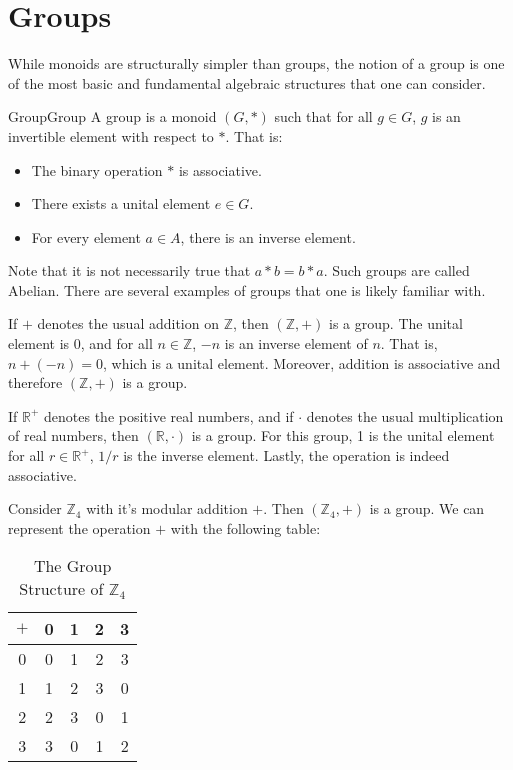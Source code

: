 \section{Groups}
    While monoids are structurally simpler than groups, the notion of a group
    is one of the most basic and fundamental algebraic structures that one can
    consider.
    \begin{fdefinition}{Group}{Group}
        A group is a \gls{monoid} $(G,*)$ such that for all $g\in{G}$, $g$ is
        an \gls{invertible element} with respect to $*$. That is:
        \begin{itemize}
            \setlength\itemsep{0em}
            \item The binary operation $*$ is associative.
            \item There exists a unital element $e\in{G}$.
            \item For every element $a\in{A}$, there is an inverse element.
        \end{itemize}
    \end{fdefinition}
    Note that it is not necessarily true that $a*b=b*a$. Such groups are called
    Abelian. There are several examples of groups that one is likely familiar
    with.
    \begin{example}
        If $+$ denotes the usual addition on $\mathbb{Z}$, then
        $(\mathbb{Z},+)$ is a group. The unital element is 0, and for all
        $n\in\mathbb{Z}$, $\minus{n}$ is an inverse element of $n$. That is,
        $n+(\minus{n})=0$, which is a unital element. Moreover, addition is
        associative and therefore $(\mathbb{Z},+)$ is a group.
    \end{example}
    \begin{example}
        If $\mathbb{R}^{+}$ denotes the positive real numbers, and if $\cdot$
        denotes the usual multiplication of real numbers, then
        $(\mathbb{R},\cdot)$ is a group. For this group, 1 is the unital
        element for all $r\in\mathbb{R}^{+}$, $1/r$ is the inverse element.
        Lastly, the operation is indeed associative.
    \end{example}
    \begin{example}
        Consider $\mathbb{Z}_{4}$ with it's modular addition $+$. Then
        $(\mathbb{Z}_{4},+)$ is a group. We can represent the operation $+$ with
        the following table:
        \begin{table}[H]
            \centering
            \captionsetup{type=table}
            \begin{tabular}{c|cccc}
                $+$&0&1&2&3\\
                \hline
                0&0&1&2&3\\
                1&1&2&3&0\\
                2&2&3&0&1\\
                3&3&0&1&2
            \end{tabular}
            \caption{The Group Structure of $\mathbb{Z}_{4}$}
        \end{table}
    \end{example}
